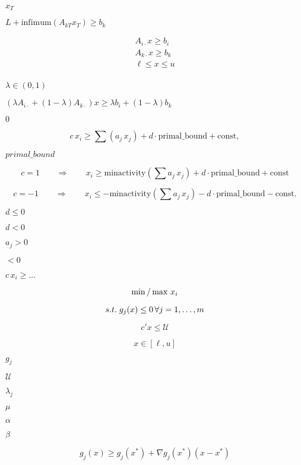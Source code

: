 \documentclass{article}
\begin{document}
$x_T$
\pagebreak

$L + \mbox{infimum}(A_{kT}x_T) \geq b_k$
\pagebreak

\begin{eqnarray*}
    A_{i\cdot} x \geq b_i \\
    A_{k\cdot} x \geq b_k \\
    \ell \leq x \leq u \\
\end{eqnarray*}
\pagebreak

$\lambda \in (0,1)$
\pagebreak

$(\lambda A_{i\cdot} + (1 - \lambda) A_{k\cdot}) x \geq \lambda b_i + (1 - \lambda) b_k$
\pagebreak

$0$
\pagebreak

\[
    c \, x_i \geq \sum (a_j \, x_j) + d \cdot \mbox{primal\_bound} + \mbox{const},
 \]
\pagebreak

$primal\_bound$
\pagebreak

\[
    c = 1   \qquad\Rightarrow\qquad   x_i \geq  \mbox{minactivity}(\sum a_j \, x_j)
                                      + d \cdot \mbox{primal\_bound} + \mbox{const}
 \]
\pagebreak

\[
    c = -1  \qquad\Rightarrow\qquad   x_i \leq - \mbox{minactivity}(\sum a_j \, x_j)
                                      - d \cdot \mbox{primal\_bound} - \mbox{const}.
 \]
\pagebreak

$d \leq 0$
\pagebreak

$d < 0$
\pagebreak

$a_j > 0$
\pagebreak

$< 0$
\pagebreak

$c\, x_i \geq \ldots$
\pagebreak

\[
     \min / \max \, x_i \\
\]
\pagebreak

\[
     s.t. \; g_j(x) \le 0 \, \forall j=1,\ldots,m \\
\]
\pagebreak

\[
     c'x \le \mathcal{U}
\]
\pagebreak

\[
     x \in [\ell,u]
\]
\pagebreak

$ g_j $
\pagebreak

$ \mathcal{U} $
\pagebreak

$ \lambda_j $
\pagebreak

$ \mu $
\pagebreak

$
\alpha $
\pagebreak

$
\beta $
\pagebreak

\[
     g_j(x) \ge g_j(x^*) + \nabla g_j(x^*)(x-x^*)
\]
\pagebreak
\end{document}
